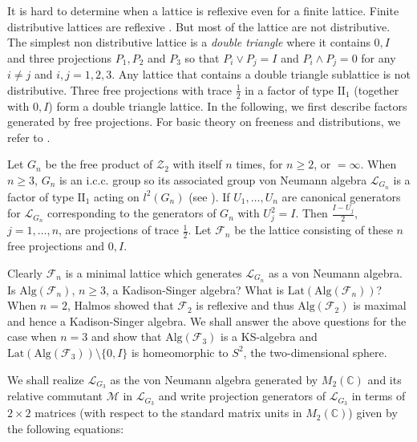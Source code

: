 \documentclass{pnastwo}
\newcommand{\F}{\mathcal F}
\newcommand{\LLL}{\mathcal L} %
\newcommand{\M}{\mathcal M}
\newcommand{\ZZZ}{\mathcal Z}
\newcommand{\II}{\mathrm{II}}
\newcommand{\Lat}{\mathrm{Lat}}
\newcommand{\Alg}{\mathrm{Alg}}
\newcommand{\C}{\mathbb C} %
\begin{document}
\begin{article}
It is hard to determine when a lattice is reflexive even for a
finite lattice. Finite distributive lattices are reflexive \cite{Ha}.
But most of the lattice are not distributive. The simplest non
distributive lattice is a {\it double triangle} where it contains
$0, I$ and three projections $P_1,P_2$ and $P_3$ so that $P_i\vee
P_j=I$ and $P_i\wedge P_j=0$ for any $i\neq j$ and $i,j=1,2,3$.
Any lattice that contains a double triangle sublattice is not
distributive. Three free projections with trace $\frac12$ in a
factor of type $\II_1$ (together with $0,I$) form a double
triangle lattice. In the following, we first describe factors
generated by free projections. For basic theory on freeness and
distributions, we refer to \cite{VDN}.

Let $G_n$ be the free product of $\ZZZ_2$ with itself $n$ times, for
$n\ge2$, or $=\infty$. When $n\ge3$, $G_n$ is an i.c.c. group so
its associated group von Neumann algebra $\LLL_{G_n}$ is a factor of
type $\II_1$ acting on $l^2(G_n)$ (see \cite{KR}). If $U_1,\ldots,U_n$
are canonical generators for $\LLL_{G_n}$ corresponding to the
generators of $G_n$ with $U_j^2=I$. Then $\frac{I-U_j}2$,
$j=1,\ldots,n$, are projections of trace $\frac12$.  Let $\F_n$ be
the lattice consisting of these $n$ free projections and $0, I$.

Clearly $\F_n$ is a minimal lattice which generates $\LLL_{G_n}$ as
a von Neumann algebra. Is $\Alg(\F_n)$, $n\ge3$, a Kadison-Singer
algebra? What is $\Lat(\Alg(\F_n))$? When $n=2$, Halmos \cite{H} showed
that $\F_2$ is reflexive and thus $\Alg(\F_2)$ is maximal and
hence a Kadison-Singer algebra. We shall answer the above
questions for the case when $n=3$ and show that $\Alg(\F_3)$ is a
KS-algebra and $\Lat(\Alg(\F_3))\setminus \{0,I\}$ is homeomorphic
to $S^2$, the two-dimensional sphere.

We shall realize $\LLL_{G_3}$ as the von Neumann algebra generated
by $M_2(\C)$ and its relative commutant $\M$ in $\LLL_{G_3}$ and
write projection generators of $\LLL_{G_3}$ in terms of $2\times 2$
matrices (with respect to the standard matrix units in $M_2(\C)$)
given by the following equations:


\end{article}
\end{document}
